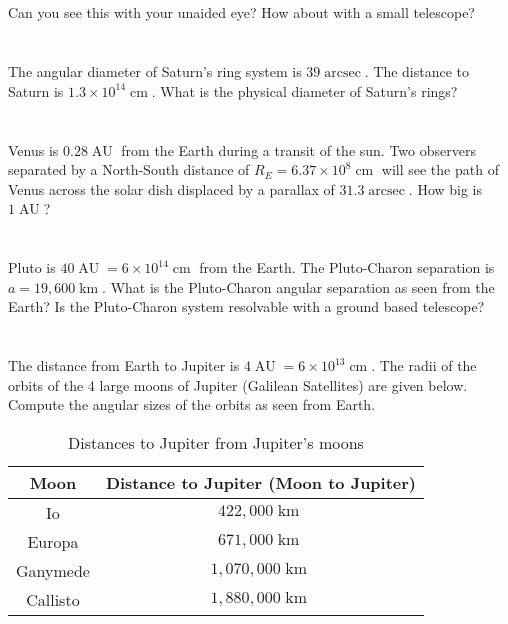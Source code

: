 \documentclass[11pt]{scrartcl}
\DeclareMathOperator{\AU}{AU}
\DeclareMathOperator{\arcsec}{arcsec}
\DeclareMathOperator{\km}{km}
\DeclareMathOperator{\cm}{cm}
\newcommand\pow[2]{\ensuremath{#1 \times 10^{#2}}}
\begin{document}
\subsection{}

Can you see this with your unaided eye? How about with a small telescope?


\section{}

The angular diameter of Saturn's ring system is $39 \arcsec$. The distance to Saturn is $\pow{1.3}{14}\cm$. What is the physical diameter of Saturn's rings?


\section{}

Venus is $0.28\AU$ from the Earth during a transit of the sun. Two observers separated by a North-South distance of $R_E = \pow{6.37}{8}\cm$ will see the path of Venus across the solar dish displaced by a parallax of $31.3\arcsec$. How big is $1\AU$?


\section{}

Pluto is $40\AU = \pow{6}{14}\cm$ from the Earth. The Pluto-Charon separation is $a = 19,600\km$. What is the Pluto-Charon angular separation as seen from the Earth? Is the Pluto-Charon system resolvable with a ground based telescope?


\section{}

The distance from Earth to Jupiter is $4\AU = \pow{6}{13}\cm$. The radii of the orbits of the 4 large moons of Jupiter (Galilean Satellites) are given below. Compute the angular sizes of the orbits as seen from Earth.

\begin{table}[H]
\centering
\begin{tabular}{c c}
\toprule
Moon & Distance to Jupiter (Moon to Jupiter) \\
\midrule
Io & $422,000\km$ \\
Europa & $671,000\km$ \\
Ganymede & $1,070,000\km$ \\
Callisto & $1,880,000\km$ \\
\bottomrule
\end{tabular}
\caption{Distances to Jupiter from Jupiter's moons}
\end{table}
\end{document}
